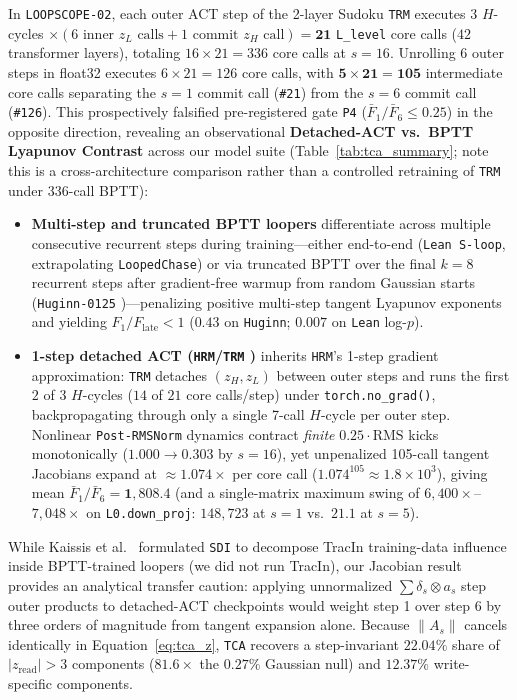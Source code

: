 \documentclass[10pt,letterpaper]{article}
\begin{document}
In \texttt{LOOPSCOPE-02}, each outer ACT step of the 2-layer Sudoku \texttt{TRM} executes $3$ $H$-cycles $\times (6 \text{ inner } z_L \text{ calls} + 1 \text{ commit } z_H \text{ call}) = \mathbf{21}$ \texttt{L\_level} core calls ($42$ transformer layers), totaling $16 \times 21 = 336$ core calls at $s=16$. Unrolling 6 outer steps in float32 executes $6 \times 21 = 126$ core calls, with $\mathbf{5 \times 21 = 105}$ intermediate core calls separating the $s=1$ commit call (\texttt{\#21}) from the $s=6$ commit call (\texttt{\#126}). This prospectively falsified pre-registered gate \texttt{P4} ($\bar{F}_1/\bar{F}_6 \le 0.25$) in the opposite direction, revealing an observational \textbf{Detached-ACT vs.\ BPTT Lyapunov Contrast} across our model suite (Table~\ref{tab:tca_summary}; note this is a cross-architecture comparison rather than a controlled retraining of \texttt{TRM} under 336-call BPTT):
\begin{itemize}
  \item \textbf{Multi-step and truncated BPTT loopers} differentiate across multiple consecutive recurrent steps during training—either end-to-end (\texttt{Lean S-loop}, extrapolating \texttt{LoopedChase}) or via truncated BPTT over the final $k=8$ recurrent steps after gradient-free warmup from random Gaussian starts (\texttt{Huginn-0125} \cite{geiping2025huginn})—penalizing positive multi-step tangent Lyapunov exponents and yielding $F_1 / F_{\mathrm{late}} < 1$ ($0.43$ on \texttt{Huginn}; $0.007$ on \texttt{Lean} log-$p$).
  \item \textbf{1-step detached ACT (\texttt{HRM}/\texttt{TRM} \cite{wang2025hrm,jolicoeur2025trm})} inherits \texttt{HRM}'s 1-step gradient approximation: \texttt{TRM} detaches $(z_H, z_L)$ between outer steps and runs the first $2$ of $3$ $H$-cycles ($14$ of $21$ core calls/step) under \texttt{torch.no\_grad()}, backpropagating through only a single 7-call $H$-cycle per outer step. Nonlinear \texttt{Post-RMSNorm} dynamics contract \emph{finite} $0.25\cdot\mathrm{RMS}$ kicks monotonically ($1.000 \to 0.303$ by $s=16$), yet unpenalized 105-call tangent Jacobians expand at $\approx 1.074\times$ per core call ($1.074^{105} \approx 1.8\times 10^3$), giving mean $\bar{F}_1/\bar{F}_6 = \mathbf{1{,}808.4}$ (and a single-matrix maximum swing of $6{,}400\times$--$7{,}048\times$ on \texttt{L0.down\_proj}: $148{,}723$ at $s=1$ vs.\ $21.1$ at $s=5$).
\end{itemize}
While Kaissis et al.\ \cite{kaissis2026sdi} formulated \texttt{SDI} to decompose TracIn training-data influence inside BPTT-trained loopers (we did not run TracIn), our Jacobian result provides an analytical transfer caution: applying unnormalized $\sum \delta_s \otimes a_s$ step outer products to detached-ACT checkpoints would weight step 1 over step 6 by three orders of magnitude from tangent expansion alone. Because $\|A_s\|$ cancels identically in Equation~\eqref{eq:tca_z}, \texttt{TCA} recovers a step-invariant $\mathbf{22.04\%}$ share of $|z_{\mathrm{read}}| > 3$ components ($81.6\times$ the $0.27\%$ Gaussian null) and $12.37\%$ write-specific components.
\end{document}
